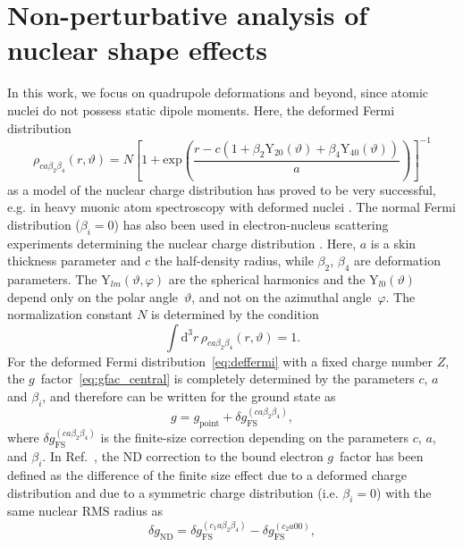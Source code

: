 \section{Non-perturbative analysis of nuclear shape effects}
\label{sec:gfac_shape}
In this work, we focus on quadrupole deformations and beyond, since atomic nuclei do not possess static dipole moments. Here, the deformed Fermi distribution
\begin{equation}
\rho_{ca\beta_2\beta_4}(r,\vartheta)=N\left[1+\text{exp}\left(\frac{r-c(1+\beta_2 \text{Y}_{20}(\vartheta)+\beta_4 \text{Y}_{40}(\vartheta))}{a}\right)\right]^{-1}
\label{eq:deffermi}
\end{equation}
as a model of the nuclear charge distribution has proved to be very successful, e.g. in heavy muonic atom spectroscopy with deformed nuclei \cite{hitlin1970,tanaka1984}. The normal Fermi distribution (${\beta_i}{=}{0}$) has also been used in electron-nucleus scattering experiments determining the nuclear charge distribution \cite{hahn1956}. Here, $a$ is a skin thickness parameter and $c$ the half-density radius, while $\beta_2$, $\beta_4$ are deformation parameters. The $\text{Y}_{lm}(\vartheta,\varphi)$ are the spherical harmonics and the $\text{Y}_{l0}(\vartheta)$ depend only on the polar angle~$\vartheta$, and not on the azimuthal angle~$\varphi$. The normalization constant $N$ is determined by the condition
\begin{equation}
\int \text{d}^3r\, \rho_{ca\beta_2\beta_4}(r,\vartheta)=1.
\end{equation}%
For the deformed Fermi distribution~\eqref{eq:deffermi} with a fixed charge number $Z$, the $g$~factor~\eqref{eq:gfac_central} is completely determined by the parameters $c$, $a$ and $\beta_i$, and therefore can be written for the ground state as
\begin{equation}
g = g_{\text{point}} + \delta g^{(ca\beta_2\beta_4)}_{\text{FS}},
\label{eq:finiteDef}
\end{equation}
where $\delta g^{(ca\beta_2\beta_4)}_{\text{FS}}$ is the finite-size correction depending on the parameters $c$, $a$, and $\beta_i$. In Ref.~\cite{jacek2012}, the ND correction to the bound electron $g$~factor has been defined as the difference of the finite size effect due to a deformed charge distribution and due to a symmetric charge distribution (i.e. ${\beta_i}{=}{0}$) with the same nuclear RMS radius as
\begin{equation}
\delta g_{\text{ND}}=\delta g^{(c_1a\beta_2\beta_4)}_{\text{FS}} - \delta g^{(c_2a00)}_{\text{FS}},
\label{eq:defdgnd}
\end{equation}
